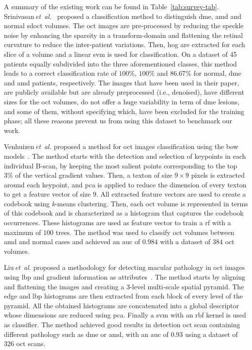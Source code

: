 A summary of the existing work can be found in Table~\ref{tab:survey-tab}.
Srinivasan\,\textit{et~al.}~\cite{Srinivasan2014} proposed a classification method to distinguish \ac{dme}, \ac{amd} and normal \ac{sdoct} volumes.
The \ac{oct} images are pre-processed by reducing the speckle noise by enhancing the sparsity in a transform-domain and flattening the retinal curvature to reduce the inter-patient variations.
Then, \ac{hog} are extracted for each slice of a volume and a linear \ac{svm} is used for classification.
On a dataset of 45 patients equally subdivided into the three aforementioned classes, this method leads to a correct classification rate of $100 \%$, $100 \%$ and $86.67 \%$ for normal, \ac{dme} and \ac{amd} patients, respectively.
The images that have been used in their paper, are publicly available but are already preprocessed (i.e., denoised), have different sizes for the \ac{oct} volumes, do not offer a huge variability in term of \ac{dme} lesions, and some of them, without specifying which, have been excluded for the training phase; all these reasons prevent us from using this dataset to benchmark our work. 

Venhuizen\,\textit{et~al.} proposed a method for \ac{oct} images classification using the \ac{bow} models~\cite{Venhuizen2015}.
The method starts with the detection and selection of keypoints in each individual B-scan, by keeping the most salient points corresponding to the top $3 \%$ of the vertical gradient values. Then, a texton of size $9 \times 9$ pixels is extracted around each keypoint, and \ac{pca} is applied to reduce the dimension of every texton to get a feature vector of size $9$.
All extracted feature vectors are used to create a codebook using \textit{k}-means clustering.
Then, each \ac{oct} volume is represented in terms of this codebook and is characterized as a histogram that captures the codebook occurrences.
These histograms are used as feature vector to train a \ac{rf} with a maximum of $100$ trees.
The method was used to classify \ac{oct} volumes between \ac{amd} and normal cases and achieved an \ac{auc} of $0.984$ with a dataset of $384$ \ac{oct} volumes.

Liu\,\textit{et~al.} proposed a methodology for detecting macular pathology in \ac{oct} images using \ac{lbp} and gradient information as attributes~\cite{Liu2011}.
The method starts by aligning and flattening the images and creating a $3$-level multi-scale spatial pyramid.
The edge and \ac{lbp} histograms are then extracted from each block of every level of the pyramid.
All the obtained histograms are concatenated into a global descriptor whose dimensions are reduced using \ac{pca}.
Finally a \ac{svm} with an \ac{rbf} kernel is used as classifier.
The method achieved good results in detection \ac{oct} scan containing different pathology such as \ac{dme} or \ac{amd}, with an \ac{auc} of $0.93$ using a dataset of $326$ \ac{oct} scans.

